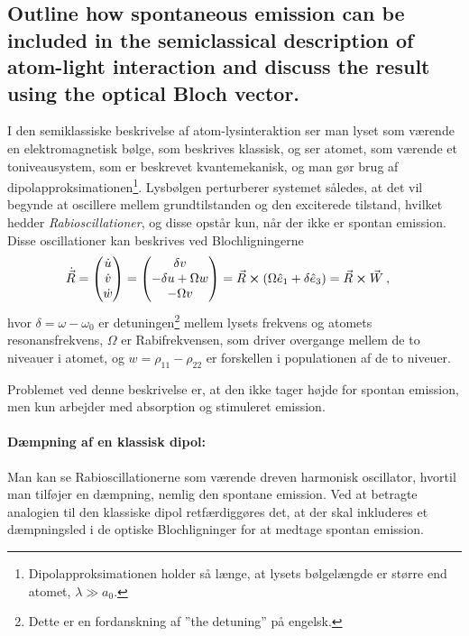 \subsection{Outline how spontaneous emission can be included in the semiclassical description of atom-light interaction and discuss the result using the optical Bloch vector.}


I den semiklassiske beskrivelse af atom-lysinteraktion ser man lyset som værende en elektromagnetisk bølge, som beskrives klassisk, og ser atomet, som værende et toniveausystem, som er beskrevet kvantemekanisk, og man gør brug af dipolapproksimationen\footnote{Dipolapproksimationen holder så længe, at lysets bølgelængde er større end atomet, $\lambda \gg a_0$.}. Lysbølgen perturberer systemet således, at det vil begynde at oscillere mellem grundtilstanden og den exciterede tilstand, hvilket hedder \emph{Rabioscillationer}, og disse opstår kun, når der ikke er spontan emission. Disse oscillationer kan beskrives ved Blochligningerne
\begin{align}
    \Dot{\Vec{R}} &=
        \begin{pmatrix}
            \Dot{u} \\
            \Dot{v} \\
            \Dot{w}
        \end{pmatrix}
    =
        \begin{pmatrix}
            \delta v \\
            -\delta u + \Omega w \\
            -\Omega v
        \end{pmatrix}
    = \Vec{R} \cross \left(\Omega\Hat{e}_1 + \delta\Hat{e}_3\right)
    = \Vec{R} \cross \Vec{W} \: ,
\end{align}
hvor $\delta = \omega - \omega_0$ er detuningen\footnote{Dette er en fordanskning af ''the detuning'' på engelsk.} mellem lysets frekvens og atomets resonansfrekvens, $\Omega$ er Rabifrekvensen, som driver overgange mellem de to niveauer i atomet, og $w = \rho_{11} - \rho_{22}$ er forskellen i populationen af de to niveuer.

Problemet ved denne beskrivelse er, at den ikke tager højde for spontan emission, men kun arbejder med absorption og stimuleret emission.


\paragraph{Dæmpning af en klassisk dipol:} Man kan se Rabioscillationerne som værende dreven harmonisk oscillator, hvortil man tilføjer en dæmpning, nemlig den spontane emission. Ved at betragte analogien til den klassiske dipol retfærdiggøres det, at der skal inkluderes et dæmpningsled i de optiske Blochligninger for at medtage spontan emission.

